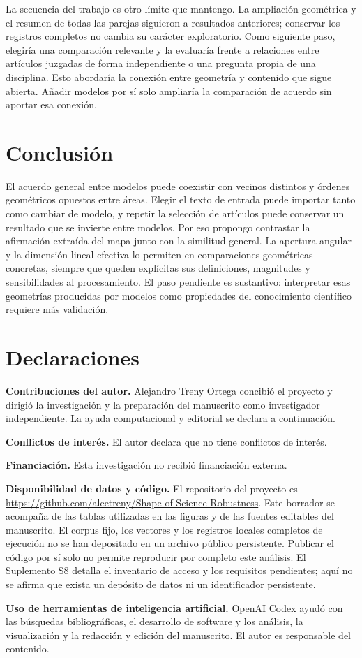 \documentclass[12pt]{article}
\begin{document}
La secuencia del trabajo es otro límite que mantengo. La ampliación geométrica y el resumen de todas las parejas siguieron a resultados anteriores; conservar los registros completos no cambia su carácter exploratorio. Como siguiente paso, elegiría una comparación relevante y la evaluaría frente a relaciones entre artículos juzgadas de forma independiente o una pregunta propia de una disciplina. Esto abordaría la conexión entre geometría y contenido que sigue abierta. Añadir modelos por sí solo ampliaría la comparación de acuerdo sin aportar esa conexión.

\section{Conclusión}
El acuerdo general entre modelos puede coexistir con vecinos distintos y órdenes geométricos opuestos entre áreas. Elegir el texto de entrada puede importar tanto como cambiar de modelo, y repetir la selección de artículos puede conservar un resultado que se invierte entre modelos. Por eso propongo contrastar la afirmación extraída del mapa junto con la similitud general. La apertura angular y la dimensión lineal efectiva lo permiten en comparaciones geométricas concretas, siempre que queden explícitas sus definiciones, magnitudes y sensibilidades al procesamiento. El paso pendiente es sustantivo: interpretar esas geometrías producidas por modelos como propiedades del conocimiento científico requiere más validación.

\section*{Declaraciones}
\textbf{Contribuciones del autor.}
Alejandro Treny Ortega concibió el proyecto y dirigió la investigación y la preparación del manuscrito como investigador independiente. La ayuda computacional y editorial se declara a continuación.
\par\medskip
\textbf{Conflictos de interés.}
El autor declara que no tiene conflictos de interés.
\par\medskip
\textbf{Financiación.}
Esta investigación no recibió financiación externa.
\par\medskip
\textbf{Disponibilidad de datos y código.}
El repositorio del proyecto es \url{https://github.com/aleetreny/Shape-of-Science-Robustness}. Este borrador se acompaña de las tablas utilizadas en las figuras y de las fuentes editables del manuscrito. El corpus fijo, los vectores y los registros locales completos de ejecución no se han depositado en un archivo público persistente. Publicar el código por sí solo no permite reproducir por completo este análisis. El Suplemento S8 detalla el inventario de acceso y los requisitos pendientes; aquí no se afirma que exista un depósito de datos ni un identificador persistente.
\par\medskip
\textbf{Uso de herramientas de inteligencia artificial.}
OpenAI Codex ayudó con las búsquedas bibliográficas, el desarrollo de software y los análisis, la visualización y la redacción y edición del manuscrito. El autor es responsable del contenido.



\end{document}
